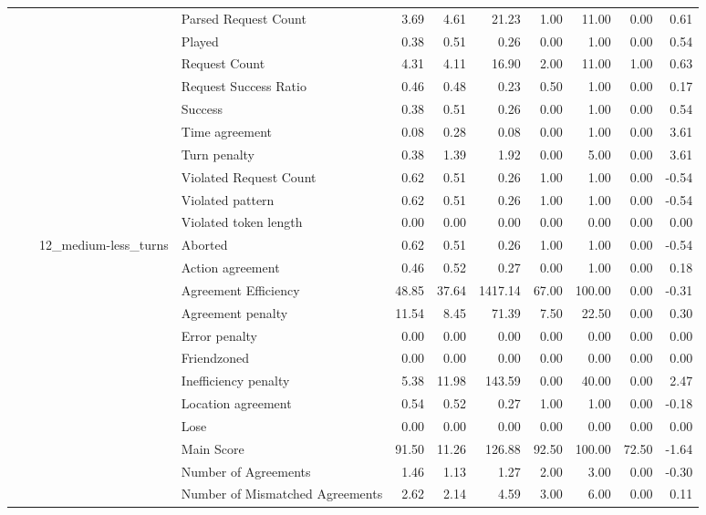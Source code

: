 \begin{tabular}{llllrrrrrrr}
 &  &  & Parsed Request Count & 3.69 & 4.61 & 21.23 & 1.00 & 11.00 & 0.00 & 0.61 \\
 &  &  & Played & 0.38 & 0.51 & 0.26 & 0.00 & 1.00 & 0.00 & 0.54 \\
 &  &  & Request Count & 4.31 & 4.11 & 16.90 & 2.00 & 11.00 & 1.00 & 0.63 \\
 &  &  & Request Success Ratio & 0.46 & 0.48 & 0.23 & 0.50 & 1.00 & 0.00 & 0.17 \\
 &  &  & Success & 0.38 & 0.51 & 0.26 & 0.00 & 1.00 & 0.00 & 0.54 \\
 &  &  & Time agreement & 0.08 & 0.28 & 0.08 & 0.00 & 1.00 & 0.00 & 3.61 \\
 &  &  & Turn penalty & 0.38 & 1.39 & 1.92 & 0.00 & 5.00 & 0.00 & 3.61 \\
 &  &  & Violated Request Count & 0.62 & 0.51 & 0.26 & 1.00 & 1.00 & 0.00 & -0.54 \\
 &  &  & Violated pattern & 0.62 & 0.51 & 0.26 & 1.00 & 1.00 & 0.00 & -0.54 \\
 &  &  & Violated token length & 0.00 & 0.00 & 0.00 & 0.00 & 0.00 & 0.00 & 0.00 \\
\cline{3-11}
 &  & \multirow[t]{27}{*}{12_medium-less_turns} & Aborted & 0.62 & 0.51 & 0.26 & 1.00 & 1.00 & 0.00 & -0.54 \\
 &  &  & Action agreement & 0.46 & 0.52 & 0.27 & 0.00 & 1.00 & 0.00 & 0.18 \\
 &  &  & Agreement Efficiency & 48.85 & 37.64 & 1417.14 & 67.00 & 100.00 & 0.00 & -0.31 \\
 &  &  & Agreement penalty & 11.54 & 8.45 & 71.39 & 7.50 & 22.50 & 0.00 & 0.30 \\
 &  &  & Error penalty & 0.00 & 0.00 & 0.00 & 0.00 & 0.00 & 0.00 & 0.00 \\
 &  &  & Friendzoned & 0.00 & 0.00 & 0.00 & 0.00 & 0.00 & 0.00 & 0.00 \\
 &  &  & Inefficiency penalty & 5.38 & 11.98 & 143.59 & 0.00 & 40.00 & 0.00 & 2.47 \\
 &  &  & Location agreement & 0.54 & 0.52 & 0.27 & 1.00 & 1.00 & 0.00 & -0.18 \\
 &  &  & Lose & 0.00 & 0.00 & 0.00 & 0.00 & 0.00 & 0.00 & 0.00 \\
 &  &  & Main Score & 91.50 & 11.26 & 126.88 & 92.50 & 100.00 & 72.50 & -1.64 \\
 &  &  & Number of Agreements & 1.46 & 1.13 & 1.27 & 2.00 & 3.00 & 0.00 & -0.30 \\
 &  &  & Number of Mismatched Agreements & 2.62 & 2.14 & 4.59 & 3.00 & 6.00 & 0.00 & 0.11 \\

\end{tabular}
